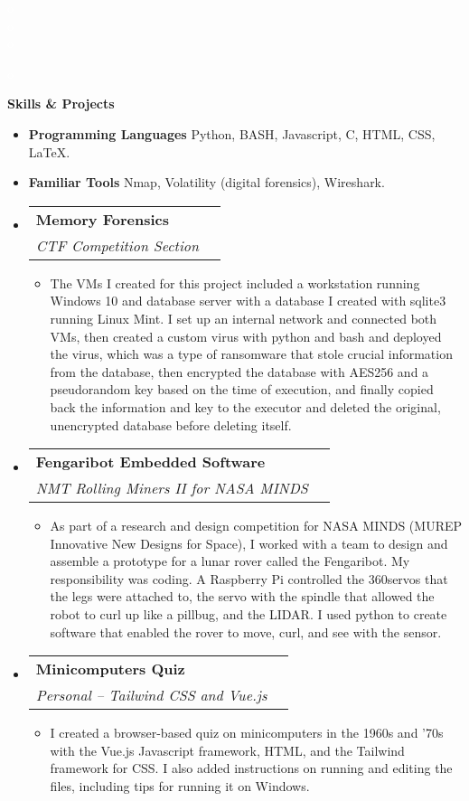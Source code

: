 \documentclass[letterpaper,12pt]{article}[leftmargin=*]
\makeatletter
\def \entryspacing {-0pt}
\renewcommand{\section}[2]{\vspace{5pt}
  \colorbox{secondary}{\color{white}\raggedbottom\normalsize\textbf{{#1}{\hspace{7pt}#2}}}
}
\newcommand{\resumeEntryStart}{\begin{itemize}[leftmargin=2.5mm]}
\newcommand{\resumeEntryEnd}{\end{itemize}\vspace{\entryspacing}}
\newcommand{\resumeItemListStart}{\begin{itemize}[leftmargin=4.5mm]}
\newcommand{\resumeItemListEnd}{\end{itemize}}
\newcommand{\resumeItem}[1]{
  \item\small{
    {#1 \vspace{-2pt}}
  }
}
\newcommand{\resumeEntryTSDL}[4]{
  \vspace{-1pt}\item[]
    \begin{tabularx}{0.97\textwidth}{X@{\hspace{60pt}}r}
      \textbf{\color{primary}#1} & {\firabook\color{accent}\small#2} \\
      \textit{\color{accent}\small#3} & \textit{\color{accent}\small#4} \\
    \end{tabularx}\vspace{-6pt}
}
\newcommand{\resumeEntryS}[2]{
  \item[]\small{
    \textbf{\color{primary}#1 }{ #2 \vspace{-6pt}}
  }
}
\makeatother
\begin{document}
{\textcolor {white} {
o\\o\\o\\}}


\newpage
{\textcolor {white} {
o\\}}

\section{\faGears}{Skills \& Projects}
 \resumeEntryStart
  \resumeEntryS{Programming Languages } {Python, BASH, Javascript, C, HTML, CSS, LaTeX.}
  \resumeEntryS{Familiar Tools } {Nmap, Volatility (digital forensics), Wireshark.}
 \resumeEntryEnd


\resumeEntryStart
    \resumeEntryTSDL
      {Memory Forensics}{}{CTF Competition Section}{}
    \resumeItemListStart
      \resumeItem {The VMs I created for this project included a workstation running Windows 10 and database server with a database I created with sqlite3 running Linux Mint. I set up an internal network and connected both VMs, then created a custom virus with python and bash and deployed the virus, which was a type of ransomware that stole crucial information from the database, then encrypted the database with AES256 and a pseudorandom key based on the time of execution, and finally copied back the information and key to the executor and deleted the original, unencrypted database before deleting itself.}
    \resumeItemListEnd
  \resumeEntryEnd

  \resumeEntryStart
    \resumeEntryTSDL
      {Fengaribot Embedded Software}{}{NMT Rolling Miners II for NASA MINDS}{}
    \resumeItemListStart
      \resumeItem {As part of a research and design competition for NASA MINDS (MUREP Innovative New Designs for Space), I worked with a team to design and assemble a prototype for a lunar rover called the Fengaribot. My responsibility was coding. A Raspberry Pi controlled the 360\degree servos that the legs were attached to, the servo with the spindle that allowed the robot to curl up like a pillbug, and the LIDAR. I used python to create software that enabled the rover to move, curl, and see with the sensor.}
    \resumeItemListEnd
  \resumeEntryEnd

  \resumeEntryStart
    \resumeEntryTSDL
      {Minicomputers Quiz}{}{Personal -- Tailwind CSS and Vue.js}{}
    \resumeItemListStart
      \resumeItem {I created a browser-based quiz on minicomputers in the 1960s and '70s with the Vue.js Javascript framework, HTML, and the Tailwind framework for CSS. I also added instructions on running and editing the files, including tips for running it on Windows.}
    \resumeItemListEnd
  \resumeEntryEnd
\end{document}
